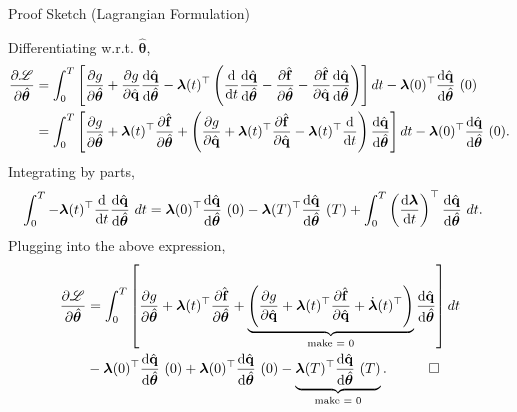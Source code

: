 \begin{frame}{Proof Sketch (Lagrangian Formulation)}

{\scriptsize
Differentiating w.r.t. $\hat{\bm{\theta}}$,
\begin{align*}
    \pdv{\mathscr{L}}{\hat{\bm{\theta}}} &= \int_0^T\left[ \pdv{g}{\hat{\bm{\theta}}} + \pdv{g}{\hat{\mathbf{q}}} \dv{\hat{\mathbf{q}}}{\hat{\bm{\theta}}} - \bm{\lambda}(t)^{\top} \left( \dv{t}\dv{\hat{\mathbf{q}}}{\hat{\bm{\theta}}} - \pdv{\hat{\mathbf{f}}}{\hat{\bm{\theta}}} - \pdv{\hat{\mathbf{f}}}{\hat{\mathbf{q}}}\dv{\hat{\mathbf{q}}}{\hat{\bm{\theta}}} \right) \right] dt - \bm{\lambda}(0)^{\top}\dv{\hat{\mathbf{q}}}{\hat{\bm{\theta}}}~(0)\notag\\
    &= \int_0^T \left[\pdv{g}{\hat{\bm{\theta}}} + \bm{\lambda}(t)^{\top} \pdv{\hat{\mathbf{f}}}{\hat{\bm{\theta}}}+ \left( \pdv{g}{\hat{\mathbf{q}}} + \bm{\lambda}(t)^{\top}\pdv{\hat{\mathbf{f}}}{\hat{\mathbf{q}}}-\bm{\lambda}(t)^{\top}\dv{t} \right)\dv{\hat{\mathbf{q}}}{\hat{\bm{\theta}}} \right]dt- \bm{\lambda}(0)^{\top}\dv{\hat{\mathbf{q}}}{\hat{\bm{\theta}}}~(0). 
\end{align*}
Integrating by parts,
\begin{align*}
    \int_0^T -\bm{\lambda}(t)^{\top}\dv{t}\dv{\hat{\mathbf{q}}}{\hat{\bm{\theta}}}~dt &= \bm{\lambda}(0)^{\top}\dv{\hat{\mathbf{q}}}{\hat{\bm{\theta}}}~(0) - \bm{\lambda}(T)^{\top}\dv{\hat{\mathbf{q}}}{\hat{\bm{\theta}}}~(T) + \int_0^T \left( \dv{\bm{\lambda}}{t}\right)^{\top}\dv{\hat{\mathbf{q}}}{\hat{\bm{\theta}}}~dt.
\end{align*}
Plugging into the above expression,
\begin{align*}
   \pdv{\mathscr{L}}{\hat{\bm{\theta}}} &= \int_0^T\left[ \pdv{g}{\hat{\bm{\theta}}} + \bm{\lambda}(t)^{\top} \pdv{\hat{\textbf{f}}}{\hat{\bm{\theta}}} + \underbrace{\left( \pdv{g}{\hat{\mathbf{q}}} + \bm{\lambda}(t)^{\top}\pdv{\hat{\mathbf{f}}}{\hat{\mathbf{q}}}+ \dot{\bm{\lambda}}(t)^{\top}\right)}_{\text{make = 0}} \dv{\hat{\mathbf{q}}}{\hat{\bm{\theta}}} \right]dt \\
   & - \bm{\lambda}(0)^{\top}\dv{\hat{\mathbf{q}}}{\hat{\bm{\theta}}}~(0)+\bm{\lambda}(0)^{\top}\dv{\hat{\mathbf{q}}}{\hat{\bm{\theta}}}~(0) - \underbrace{\bm{\lambda}(T)^{\top}\dv{\hat{\mathbf{q}}}{\hat{\bm{\theta}}}~(T)}_{\text{make = 0}}.\quad\qed
\end{align*}

}

\end{frame}


